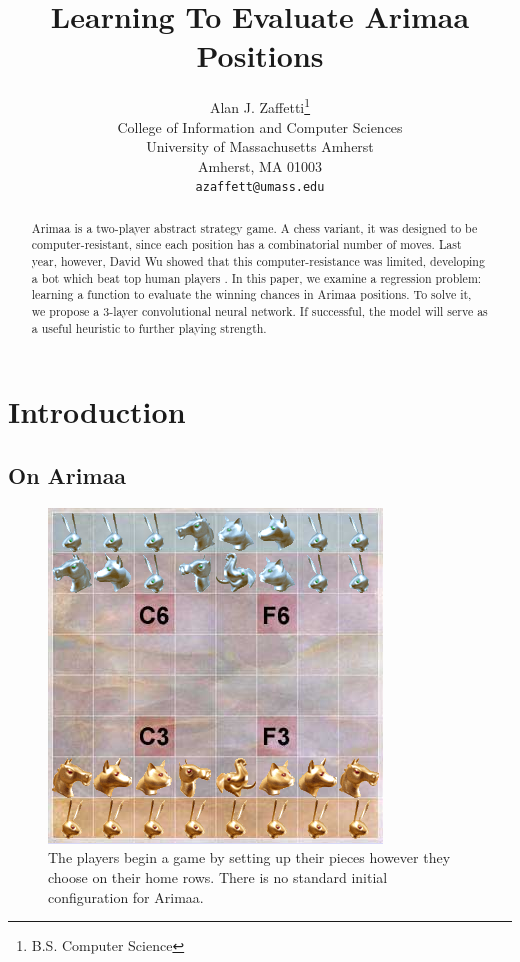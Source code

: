 \documentclass{article}
\title{Learning To Evaluate Arimaa Positions}
\author{
Alan J. Zaffetti\thanks{B.S. Computer Science} \\
College of Information and Computer Sciences\\
University of Massachusetts Amherst\\
Amherst, MA 01003 \\
\texttt{azaffett@umass.edu} \\
}
\begin{document}
\maketitle
\begin{abstract}
Arimaa is a two-player abstract strategy game.  A chess variant, it was designed to be computer-resistant, since each position has a combinatorial number of moves.  Last year, however, David Wu showed that this computer-resistance was limited, developing a bot which beat top human players \cite{wu}.  In this paper, we examine a regression problem: learning a function to evaluate the winning chances in Arimaa positions.  To solve it, we propose a 3-layer convolutional neural network.  If successful, the model will serve as a useful heuristic to further playing strength.
\end{abstract}

\section{Introduction}

\subsection{On Arimaa}

\begin{figure}[ht]
\centering
\includegraphics[scale=.4]{assets/example.png}
\caption{The players begin a game by setting up their pieces however they choose on their home rows.  There is no standard initial configuration for Arimaa.}
\end{figure}
\end{document}
